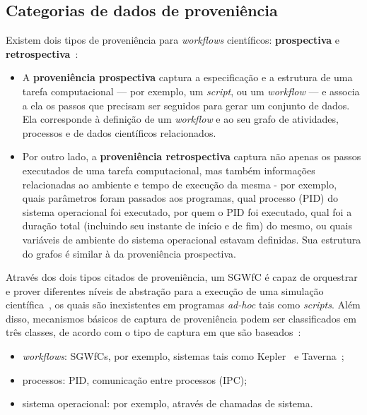 \subsection{Categorias de dados de proveniência}

Existem dois tipos de proveniência para \textit{workflows} científicos: \textbf{prospectiva} e \textbf{retrospectiva}~\cite{murta2014noworkflow,freire2008provenance}:

\begin{itemize}
    \item A \textbf{proveniência prospectiva} captura a especificação e a estrutura de uma tarefa computacional --- por exemplo, um \textit{script}, ou um \textit{workflow} --- e associa a ela os passos que precisam ser seguidos para gerar um conjunto de dados. Ela corresponde à definição de um \textit{workflow} e ao seu grafo de atividades, processos e de dados científicos relacionados.
    \item Por outro lado, a \textbf{proveniência retrospectiva} captura não apenas os passos executados de uma tarefa computacional, mas também informações relacionadas ao ambiente e tempo de execução da mesma - por exemplo, quais parâmetros foram passados aos programas, qual  processo (PID) do sistema operacional foi executado, por quem o PID foi executado, qual foi a duração total (incluindo seu instante de início e de fim) do mesmo, ou quais variáveis de ambiente do sistema operacional estavam definidas. Sua estrutura do grafos é similar à da proveniência prospectiva.
\end{itemize}

Através dos dois tipos citados de proveniência, um SGWfC é capaz de orquestrar e prover diferentes níveis de abstração para a execução de uma simulação científica~\cite{murta2014noworkflow}, os quais são inexistentes em programas \textit{ad-hoc} tais como \textit{scripts}. Além disso, mecanismos básicos de captura de proveniência podem ser classificados em três classes, de acordo com o tipo de captura em que são baseados~\cite{freire2008provenance}:

\begin{itemize}
    \item \textit{workflows}: SGWfCs, por exemplo, sistemas tais como Kepler~\cite{ludascher2006scientific} e Taverna~\cite{hull2006taverna};
    \item processos: PID, comunicação entre processos (IPC);
    \item sistema operacional: por exemplo, através de chamadas de sistema.
\end{itemize}

